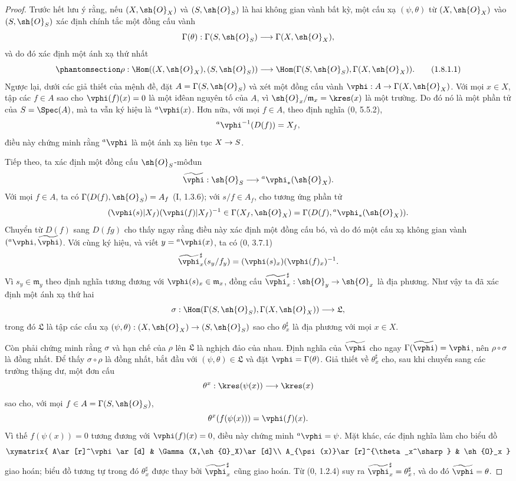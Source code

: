 \documentclass[oneside,10pt]{amsart}
\makeatletter
\newcommand{\ega@arrow}[2]{\mathchoice{#1}{#2}{#2}{#2}}
\renewcommand{\to}{\ega@arrow{\longrightarrow}{\rightarrow}}
\let\EGAOriginalLabel\label
\renewcommand{\label}[1]{\phantomsection\EGAOriginalLabel{#1}}
\makeatother
\begin{document}
\begin{proof}
Trước hết lưu ý rằng, nếu $(X,\sh{O}_X)$ và $(S,\sh{O}_S)$ là hai
không gian vành bất kỳ, một cấu xạ $(\psi,\theta)$ từ $(X,\sh{O}_X)$
vào $(S,\sh{O}_S)$ xác định chính tắc một đồng cấu vành
\[
  \Gamma(\theta):\Gamma(S,\sh{O}_S)\to\Gamma(X,\sh{O}_X),
\]
và do đó xác định một ánh xạ thứ nhất
\begin{equation}
\label{ega2:addendum:I.1.8.1.1}
  \rho:\Hom((X,\sh{O}_X),(S,\sh{O}_S))
  \to\Hom(\Gamma(S,\sh{O}_S),\Gamma(X,\sh{O}_X)).
\tag{1.8.1.1}
\end{equation}
Ngược lại, dưới các giả thiết của mệnh đề, đặt
$A=\Gamma(S,\sh{O}_S)$ và xét một đồng cấu vành
$\vphi:A\to\Gamma(X,\sh{O}_X)$. Với mọi $x\in X$, tập các $f\in A$
sao cho $\vphi(f)(x)=0$ là một iđêan nguyên tố của $A$, vì
$\sh{O}_x/\mathfrak{m}_x=\kres(x)$ là một trường. Do đó nó là một
phần tử của $S=\Spec(A)$, mà ta vẫn ký hiệu là ${}^a\vphi(x)$. Hơn
nữa, với mọi $f\in A$, theo định nghĩa (0, 5.5.2),
\[
  {}^a\vphi^{-1}(D(f))=X_f,
\]
điều này chứng minh rằng ${}^a\vphi$ là một ánh xạ liên tục $X\to S$.

Tiếp theo, ta xác định một đồng cấu $\sh{O}_S$-môđun
\[
  \widetilde{\vphi}:\sh{O}_S\to{}^a\vphi_*(\sh{O}_X).
\]
Với mọi $f\in A$, ta có
$\Gamma(D(f),\sh{O}_S)=A_f$ (I, 1.3.6); với $s/f\in A_f$, cho tương
ứng phần tử
\[
  (\vphi(s)|X_f)(\vphi(f)|X_f)^{-1}
  \in\Gamma(X_f,\sh{O}_X)
  =\Gamma(D(f),{}^a\vphi_*(\sh{O}_X)).
\]
Chuyển từ $D(f)$ sang $D(fg)$ cho thấy ngay rằng điều này xác định một
đồng cấu bó, và do đó một cấu xạ không gian vành
$({}^a\vphi,\widetilde{\vphi})$. Với cùng ký hiệu, và viết
$y={}^a\vphi(x)$, ta có (0, 3.7.1)
\[
  \widetilde{\vphi}_x^\sharp(s_y/f_y)
  =(\vphi(s)_x)(\vphi(f)_x)^{-1}.
\]
Vì $s_y\in\mathfrak{m}_y$ theo định nghĩa tương đương với
$\vphi(s)_x\in\mathfrak{m}_x$, đồng cấu
$\widetilde{\vphi}_x^\sharp:\sh{O}_y\to\sh{O}_x$ là địa phương. Như
vậy ta đã xác định một ánh xạ thứ hai
\[
  \sigma:\Hom(\Gamma(S,\sh{O}_S),\Gamma(X,\sh{O}_X))
  \to\mathfrak{L},
\]
trong đó $\mathfrak{L}$ là tập các cấu xạ
$(\psi,\theta):(X,\sh{O}_X)\to(S,\sh{O}_S)$ sao cho
$\theta_x^\sharp$ là địa phương với mọi $x\in X$.

Còn phải chứng minh rằng $\sigma$ và hạn chế của $\rho$ lên
$\mathfrak{L}$ là nghịch đảo của nhau. Định nghĩa của
$\widetilde{\vphi}$ cho ngay $\Gamma(\widetilde{\vphi})=\vphi$, nên
$\rho\circ\sigma$ là đồng nhất. Để thấy $\sigma\circ\rho$ là đồng
nhất, bắt đầu với $(\psi,\theta)\in\mathfrak{L}$ và đặt
$\vphi=\Gamma(\theta)$. Giả thiết về $\theta_x^\sharp$ cho, sau khi
chuyển sang các trường thặng dư, một đơn cấu
\[
  \theta^x:\kres(\psi(x))\to\kres(x)
\]
sao cho, với mọi $f\in A=\Gamma(S,\sh{O}_S)$,
\[
  \theta^x(f(\psi(x)))=\vphi(f)(x).
\]
Vì thế $f(\psi(x))=0$ tương đương với $\vphi(f)(x)=0$, điều này chứng
minh ${}^a\vphi=\psi$. Mặt khác, các định nghĩa làm cho biểu đồ
\[
  \xymatrix{
    A\ar[r]^\vphi\ar[d] &
    \Gamma(X,\sh{O}_X)\ar[d]\\
    A_{\psi(x)}\ar[r]^{\theta_x^\sharp} &
    \sh{O}_x
  }
\]
giao hoán; biểu đồ tương tự trong đó $\theta_x^\sharp$ được thay bởi
$\widetilde{\vphi}_x^\sharp$ cũng giao hoán. Từ (0, 1.2.4) suy ra
$\widetilde{\vphi}_x^\sharp=\theta_x^\sharp$, và do đó
$\widetilde{\vphi}=\theta$.
\end{proof}
\end{document}
